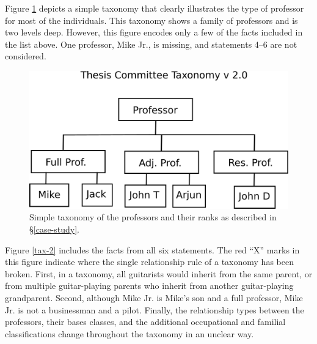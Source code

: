 Figure \ref{tax-1} depicts a simple taxonomy that clearly
illustrates the type of professor for most of the individuals. This taxonomy
shows a family of professors and is two levels deep. However, this figure
encodes only a few of the facts included in the list above. One professor, Mike
Jr., is missing, and statements 4--6 are not considered.

\begin{figure}[htbp]
\centering
\includegraphics[width=\textwidth]{figures/tc-tax-v2.png}
\caption{Simple taxonomy of the professors and their ranks as described
in \S \ref{case-study}.}
\label{tax-1}
\end{figure}

Figure \ref{tax-2} includes the facts from all six statements. The red ``X''
marks in this figure indicate where the single relationship rule of a taxonomy
has been broken. First, in a taxonomy, all guitarists would inherit from the
same parent, or from multiple guitar-playing parents who inherit from another
guitar-playing grandparent. Second, although Mike Jr. is Mike's son
and a full professor, Mike Jr. is not a businessman and a pilot. Finally, the
relationship types between the professors, their bases classes, and the
additional occupational and familial classifications change throughout the
taxonomy in an unclear way.

